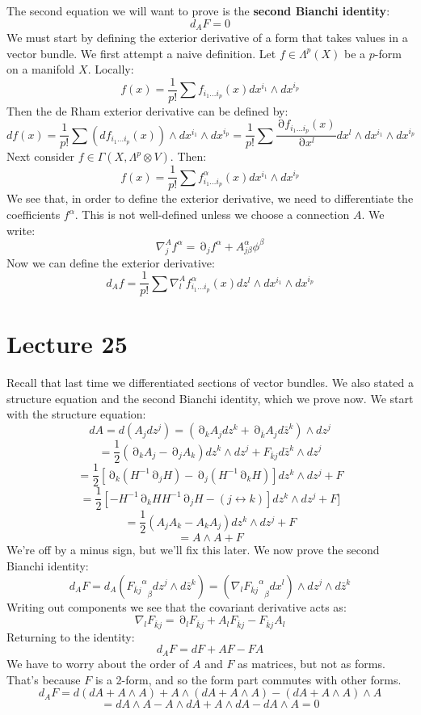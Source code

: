 \documentclass[12 pt]{article}
\DeclareMathOperator {\p} {\partial}
\theoremstyle{plain}
\theoremstyle{definition}
\theoremstyle{remark}
\begin{document}
The second equation we will want to prove is the \textbf{second Bianchi identity}:
\[        d_A F = 0    \]
We must start by defining the exterior derivative of a form that takes values in a vector bundle. We first attempt a naive definition. Let $f \in \Lambda^p(X)$ be a $p$-form on a manifold $X$. Locally:
\[       f(x) = \frac{1}{p!} \sum f_{i_1 \dots i_p} (x) dx^{i_1} \wedge dx^{i_p}     \]
Then the de Rham exterior derivative can be defined by:
\[        df(x) = \frac{1}{p!} \sum (df_{i_1 \dots i_p} (x)) \wedge dx^{i_1} \wedge dx^{i_p}  =  \frac{1}{p!} \sum \frac{\p f_{i_1 \dots i_p} (x)}{\p x^l}   dx^l \wedge dx^{i_1} \wedge dx^{i_p}      \]
Next consider $f \in \Gamma(X, \Lambda^p \otimes V)$. Then:
\[       f(x) = \frac{1}{p!} \sum f^{\alpha}_{i_1 \dots i_p} (x) dx^{i_1} \wedge dx^{i_p}     \]
We see that, in order to define the exterior derivative, we need to differentiate the coefficients $f^{\alpha}$. This is not well-defined unless we choose a connection $A$. We write:
\[        \nabla_j^A f^{\alpha} = \p_j f^{\alpha} + A^{\alpha}_{j \beta} \phi^{\beta}     \]
Now we can define the exterior derivative:
\[       d_A f =  \frac{1}{p!} \sum \nabla^A_l f^{\alpha}_{i_1 \dots i_p} (x) dz^l \wedge dx^{i_1} \wedge dx^{i_p}       \]


\section*{Lecture 25}
Recall that last time we differentiated sections of vector bundles. We also stated a structure equation and the second Bianchi identity, which we prove now. We start with the structure equation:
\[       dA = d ( A_j dz^j) = (\p_k A_j dz^k + \p_{\bar k} A_j d \bar z^k) \wedge dz^j     \]
\[          = \frac{1}{2} ( \p_k A_j - \p_j A_k) dz^k \wedge dz^j + F_{\bar k j} d \bar z^k \wedge dz^j     \]
\[       = \frac{1}{2} [ \p_k (H^{-1} \p_j H) - \p_j (H^{-1} \p_k H) ] dz^k \wedge dz^j + F      \]
\[       = \frac{1}{2} [   - H^{-1} \p_k H H^{-1} \p_j H - (j \leftrightarrow k) ] dz^k \wedge dz^j + F  ]      \]
\[        =  \frac{1}{2} (A_j A_k - A_k A_j) dz^k \wedge dz^j + F       \]
\[     = A \wedge A + F    \]
We're off by a minus sign, but we'll fix this later. We now prove the second Bianchi identity:
\[       d_A F = d_A ({{F_{\bar k j}}^{\alpha}}_{\beta} dz^j \wedge d\bar z^k  )  = (\nabla_l {{F_{\bar k j}}^{\alpha}}_{\beta} dx^l) \wedge dz^j \wedge d\bar z^k \]
Writing out components we see that the covariant derivative acts as:
\[     \nabla_l F_{\bar k j} = \p_l F_{\bar k j} + A_l F_{\bar k j} - F_{\bar k j}A_l     \]
Returning to the identity:
\[      d_A F = dF + AF - FA     \]
We have to worry about the order of $A$ and $F$ as matrices, but not as forms. That's because $F$ is a 2-form, and so the form part commutes with other forms.
\[      d_A F = d (dA + A \wedge A) + A \wedge ( dA + A \wedge A) - (dA + A \wedge A) \wedge A  \]
 \[ = dA \wedge A - A \wedge dA + A \wedge dA - dA \wedge A = 0    \]
\end{document}
